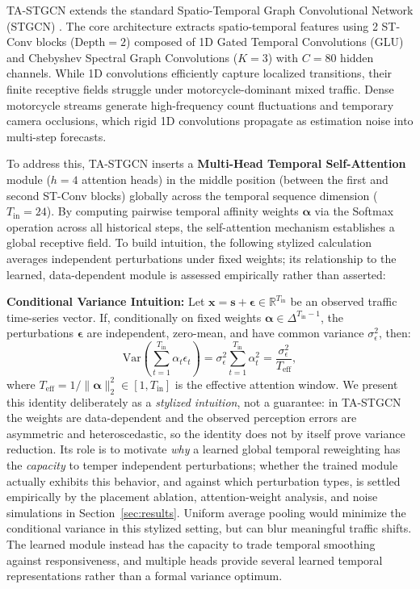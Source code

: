 \documentclass[a4paper,fleqn]{cas-sc}
\begin{document}
TA-STGCN extends the standard Spatio-Temporal Graph Convolutional Network (STGCN) \cite{stgcn}. The core architecture extracts spatio-temporal features using 2 ST-Conv blocks ($\text{Depth}=2$) composed of 1D Gated Temporal Convolutions (GLU) and Chebyshev Spectral Graph Convolutions ($K=3$) \cite{chebnet} with $C=80$ hidden channels. While 1D convolutions efficiently capture localized transitions, their finite receptive fields struggle under motorcycle-dominant mixed traffic. Dense motorcycle streams generate high-frequency count fluctuations and temporary camera occlusions, which rigid 1D convolutions propagate as estimation noise into multi-step forecasts.

To address this, TA-STGCN inserts a \textbf{Multi-Head Temporal Self-Attention} module \cite{attention} ($h=4$ attention heads) in the middle position (between the first and second ST-Conv blocks) globally across the temporal sequence dimension ($T_{\text{in}} = 24$). By computing pairwise temporal affinity weights $\boldsymbol{\alpha}$ via the Softmax operation across all historical steps, the self-attention mechanism establishes a global receptive field. To build intuition, the following stylized calculation averages independent perturbations under fixed weights; its relationship to the learned, data-dependent module is assessed empirically rather than asserted:

\textbf{Conditional Variance Intuition:}
Let $\mathbf{x} = \mathbf{s} + \boldsymbol{\epsilon} \in \mathbb{R}^{T_{\text{in}}}$ be an observed traffic time-series vector. If, conditionally on fixed weights $\boldsymbol{\alpha} \in \Delta^{T_{\text{in}}-1}$, the perturbations $\boldsymbol{\epsilon}$ are independent, zero-mean, and have common variance $\sigma_{\epsilon}^2$, then:
\begin{equation}
\label{eq:attn_var}
\text{Var}\left( \sum_{t=1}^{T_{\text{in}}} \alpha_t \epsilon_t \right) = \sigma_{\epsilon}^2 \sum_{t=1}^{T_{\text{in}}} \alpha_t^2 = \frac{\sigma_{\epsilon}^2}{T_{\text{eff}}},
\end{equation}
where $T_{\text{eff}} = 1 / \|\boldsymbol{\alpha}\|_2^2 \in [1, T_{\text{in}}]$ is the effective attention window. We present this identity deliberately as a \emph{stylized intuition}, not a guarantee: in TA-STGCN the weights are data-dependent and the observed perception errors are asymmetric and heteroscedastic, so the identity does not by itself prove variance reduction. Its role is to motivate \emph{why} a learned global temporal reweighting has the \emph{capacity} to temper independent perturbations; whether the trained module actually exhibits this behavior, and against which perturbation types, is settled empirically by the placement ablation, attention-weight analysis, and noise simulations in Section~\ref{sec:results}. Uniform average pooling would minimize the conditional variance in this stylized setting, but can blur meaningful traffic shifts. The learned module instead has the capacity to trade temporal smoothing against responsiveness, and multiple heads provide several learned temporal representations rather than a formal variance optimum.
\end{document}
